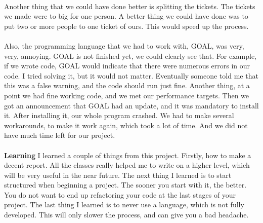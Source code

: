 \\Another thing that we could have done better is splitting the tickets. The tickets we made were to big for one person. A better thing we could have done was to put two or more people to one ticket of ours. This would speed up the process.\\
\\Also, the programming language that we had to work with, GOAL, was very, very, annoying. GOAL is not finished yet, we could clearly see that. For example, if we wrote code, GOAL would indicate that there were numerous errors in our code. I tried solving it, but it would not matter. Eventually someone told me that this was a false warning, and the code should run just fine.
Another thing, at a point we had fine working code, and we met our performance targets. Then we got an announcement that GOAL had an update, and it was mandatory to install it. After installing it, our whole program crashed. We had to make several workarounds, to make it work again, which took a lot of time. And we did not have much time left for our project.\\
\noindent \\
\textbf{Learning} I learned a couple of things from this project. Firstly, how to make a decent report. All the classes really helped me to write on a higher level, which will be very useful in the near future. The next thing I learned is to start structured when beginning a project. The sooner you start with it, the better. You do not want to end up refactoring your code at the last stages of your project. The last thing I learned is to never use a language, which is not fully developed. This will only slower the process, and can give you a bad headache.